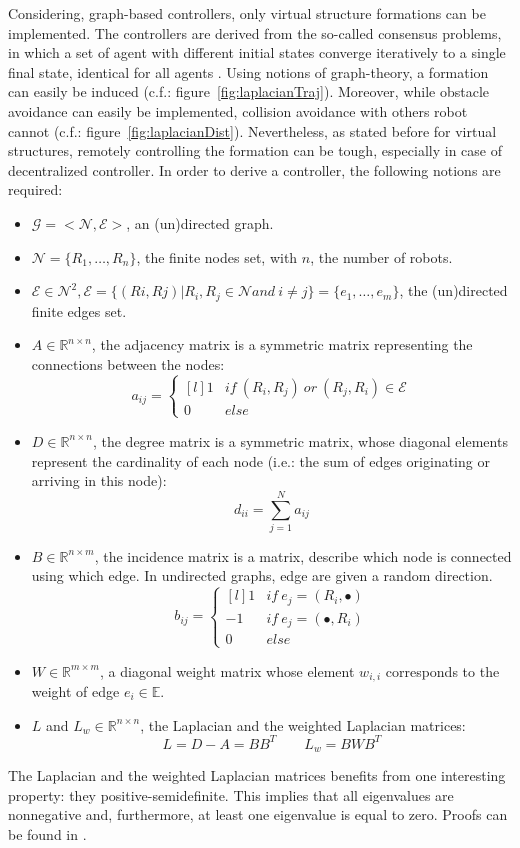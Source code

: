 \documentclass[a4paper, 12pt]{report}
\begin{document}
Considering, graph-based controllers, only virtual structure formations can be implemented. The controllers are derived from the so-called consensus problems, in which a set of agent with different initial states converge iteratively to a single final state, identical for all agents \cite{Ren2005}. Using notions of graph-theory, a formation can easily be induced (c.f.: figure~\ref{fig:laplacianTraj}). Moreover, while obstacle avoidance can easily be implemented, collision avoidance with others robot cannot (c.f.: figure~\ref{fig:laplacianDist}). Nevertheless, as stated before for virtual structures, remotely controlling the formation can be tough, especially in case of decentralized controller.  In order to derive a controller, the following notions are required:
\begin{itemize}
\item $\mathcal{G} = <\mathcal{N}, \mathcal{E}>$, an (un)directed graph.
\item $\mathcal{N} = \{R_1, \ldots, R_n\}$, the finite nodes set,  with $n$, the number of robots.
\item $\mathcal{E} \in \mathcal{N}^2, \mathcal{E} = \{(Ri,Rj)| R_i, R_j \in \mathcal{N} and\ i \neq j\} = \{e_1, \ldots, e_m\} $, the (un)directed finite edges set.
\item $A \in  \mathbb{R}^{n \times n} $, the adjacency matrix is a symmetric matrix representing the connections between the nodes:
\[a_{ij} =  \left\{ \begin{matrix*}[l] 1 & if\ (R_i, R_j)\ or\ (R_j, R_i) \in \mathcal{E} \\ 0 & else \end{matrix*} \right.\]
\item $D \in  \mathbb{R}^{n \times n} $, the degree matrix is a symmetric matrix, whose diagonal elements represent the cardinality of each node (i.e.: the sum of edges originating or arriving in this node):
\[d_{ii} =  \sum_{j=1}^{N} a_{ij}\]
\item $B \in  \mathbb{R}^{n \times m} $, the incidence matrix is a matrix, describe which node is connected using which edge. In undirected graphs, edge are given a random direction.
\[b_{ij} =  \left\{ \begin{matrix*}[l] 1 & if\ e_j = (R_i, \bullet) \\-1 & if\ e_j = (\bullet, R_i)  \\ 0 & else \end{matrix*} \right.\]
\item $W \in \mathbb{R}^{m\times m} $, a diagonal weight matrix whose element $w_{i,i}$ corresponds to the weight of edge $e_i \in \mathbb{E}$.
\item $L$ and $L_w\in \mathbb{R}^{n\times n} $, the Laplacian and the weighted Laplacian matrices:
\[ L = D-A = BB^T \qquad L_w = BWB^T\]
\end{itemize}  
The Laplacian and the weighted Laplacian matrices benefits from one interesting property: they positive-semidefinite. This implies that all eigenvalues are nonnegative and, furthermore, at least one eigenvalue is equal to zero. Proofs can be found in \cite{Gowal2013}. 
\end{document}
